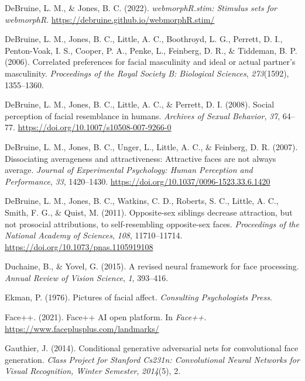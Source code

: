 \documentclass[
  doc,floatsintext]{apa6}
\newlength{\cslhangindent}
\newlength{\cslentryspacingunit} %
\newenvironment{CSLReferences}[2] %
 {%
  \setlength{\parindent}{0pt}
  \ifodd #1
  \let\oldpar\par
  \def\par{\hangindent=\cslhangindent\oldpar}
  \fi
  \setlength{\parskip}{#2\cslentryspacingunit}
 }%
 {}
\begin{document}
\begin{CSLReferences}{1}{0}
\leavevmode{}%
DeBruine, L. M., \& Jones, B. C. (2022). \emph{{webmorphR.stim}: Stimulus sets for webmorphR}. \url{https://debruine.github.io/webmorphR.stim/}

\leavevmode{}%
DeBruine, L. M., Jones, B. C., Little, A. C., Boothroyd, L. G., Perrett, D. I., Penton-Voak, I. S., Cooper, P. A., Penke, L., Feinberg, D. R., \& Tiddeman, B. P. (2006). Correlated preferences for facial masculinity and ideal or actual partner's masculinity. \emph{Proceedings of the Royal Society B: Biological Sciences}, \emph{273}(1592), 1355--1360.

\leavevmode{}%
DeBruine, L. M., Jones, B. C., Little, A. C., \& Perrett, D. I. (2008). Social perception of facial resemblance in humans. \emph{Archives of Sexual Behavior}, \emph{37}, 64--77. \url{https://doi.org/10.1007/s10508-007-9266-0}

\leavevmode{}%
DeBruine, L. M., Jones, B. C., Unger, L., Little, A. C., \& Feinberg, D. R. (2007). Dissociating averageness and attractiveness: Attractive faces are not always average. \emph{Journal of Experimental Psychology: Human Perception and Performance}, \emph{33}, 1420--1430. \url{https://doi.org/10.1037/0096-1523.33.6.1420}

\leavevmode{}%
DeBruine, L. M., Jones, B. C., Watkins, C. D., Roberts, S. C., Little, A. C., Smith, F. G., \& Quist, M. (2011). Opposite-sex siblings decrease attraction, but not prosocial attributions, to self-resembling opposite-sex faces. \emph{Proceedings of the National Academy of Sciences}, \emph{108}, 11710--11714. \url{https://doi.org/10.1073/pnas.1105919108}

\leavevmode{}%
Duchaine, B., \& Yovel, G. (2015). A revised neural framework for face processing. \emph{Annual Review of Vision Science}, \emph{1}, 393--416.

\leavevmode{}%
Ekman, P. (1976). Pictures of facial affect. \emph{Consulting Psychologists Press}.

\leavevmode{}%
Face++. (2021). Face++ AI open platform. In \emph{Face++}. \url{https://www.faceplusplus.com/landmarks/}

\leavevmode{}%
Gauthier, J. (2014). Conditional generative adversarial nets for convolutional face generation. \emph{Class Project for Stanford Cs231n: Convolutional Neural Networks for Visual Recognition, Winter Semester}, \emph{2014}(5), 2.


\end{CSLReferences}
\end{document}
